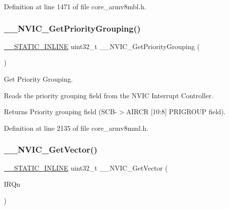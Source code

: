 Definition at line 1471 of file core\+\_\+armv8mbl.\+h.

\mbox{\label{group___c_m_s_i_s___core___n_v_i_c_functions_ga9b894af672df4373eb637f8288845c05}} 
\subsubsection{\texorpdfstring{\+\_\+\+\_\+\+N\+V\+I\+C\+\_\+\+Get\+Priority\+Grouping()}{\_\_NVIC\_GetPriorityGrouping()}}
{\footnotesize\ttfamily \hyperlink{cmsis__iccarm_8h_aba87361bfad2ae52cfe2f40c1a1dbf9c}{\+\_\+\+\_\+\+S\+T\+A\+T\+I\+C\+\_\+\+I\+N\+L\+I\+NE} uint32\+\_\+t \+\_\+\+\_\+\+N\+V\+I\+C\+\_\+\+Get\+Priority\+Grouping (\begin{DoxyParamCaption}\item[{void}]{ }\end{DoxyParamCaption})}



Get Priority Grouping. 

Reads the priority grouping field from the N\+V\+IC Interrupt Controller. \begin{DoxyReturn}{Returns}
Priority grouping field (S\+C\+B-\/$>$A\+I\+R\+CR \mbox{[}10\+:8\mbox{]} P\+R\+I\+G\+R\+O\+UP field). 
\end{DoxyReturn}


Definition at line 2135 of file core\+\_\+armv8mml.\+h.

\mbox{\label{group___c_m_s_i_s___core___n_v_i_c_functions_ga44b665d2afb708121d9b10c76ff00ee5}} 
\subsubsection{\texorpdfstring{\+\_\+\+\_\+\+N\+V\+I\+C\+\_\+\+Get\+Vector()}{\_\_NVIC\_GetVector()}}
{\footnotesize\ttfamily \hyperlink{cmsis__iccarm_8h_aba87361bfad2ae52cfe2f40c1a1dbf9c}{\+\_\+\+\_\+\+S\+T\+A\+T\+I\+C\+\_\+\+I\+N\+L\+I\+NE} uint32\+\_\+t \+\_\+\+\_\+\+N\+V\+I\+C\+\_\+\+Get\+Vector (\begin{DoxyParamCaption}\item[{\hyperlink{group___c_m_s_i_s__18_x_x___i_r_q_gaa44deabd252bda567898bae35a086adc}{I\+R\+Qn\+\_\+\+Type}}]{I\+R\+Qn }\end{DoxyParamCaption})}



